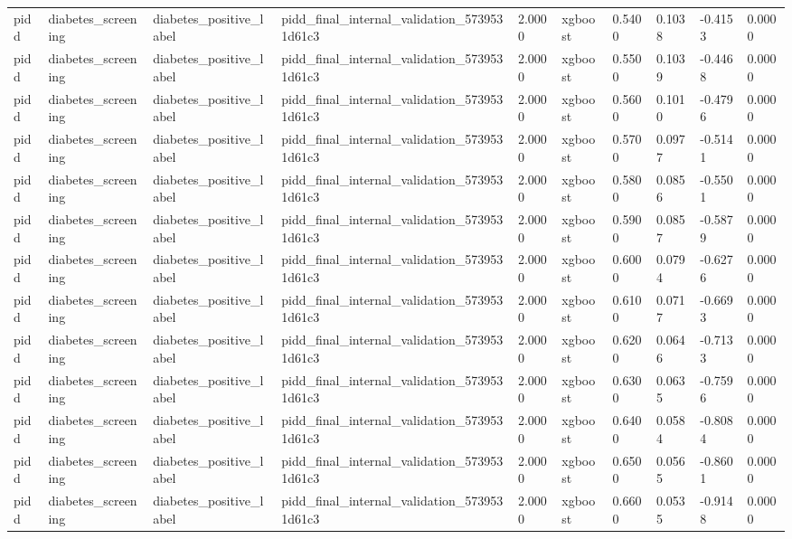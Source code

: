 \begin{tabular}{llllllllll}
pidd & diabetes\_screening & diabetes\_positive\_label & pidd\_final\_internal\_validation\_5739531d61c3 & 2.0000 & xgboost & 0.5400 & 0.1038 & -0.4153 & 0.0000 \\
pidd & diabetes\_screening & diabetes\_positive\_label & pidd\_final\_internal\_validation\_5739531d61c3 & 2.0000 & xgboost & 0.5500 & 0.1039 & -0.4468 & 0.0000 \\
pidd & diabetes\_screening & diabetes\_positive\_label & pidd\_final\_internal\_validation\_5739531d61c3 & 2.0000 & xgboost & 0.5600 & 0.1010 & -0.4796 & 0.0000 \\
pidd & diabetes\_screening & diabetes\_positive\_label & pidd\_final\_internal\_validation\_5739531d61c3 & 2.0000 & xgboost & 0.5700 & 0.0977 & -0.5141 & 0.0000 \\
pidd & diabetes\_screening & diabetes\_positive\_label & pidd\_final\_internal\_validation\_5739531d61c3 & 2.0000 & xgboost & 0.5800 & 0.0856 & -0.5501 & 0.0000 \\
pidd & diabetes\_screening & diabetes\_positive\_label & pidd\_final\_internal\_validation\_5739531d61c3 & 2.0000 & xgboost & 0.5900 & 0.0857 & -0.5879 & 0.0000 \\
pidd & diabetes\_screening & diabetes\_positive\_label & pidd\_final\_internal\_validation\_5739531d61c3 & 2.0000 & xgboost & 0.6000 & 0.0794 & -0.6276 & 0.0000 \\
pidd & diabetes\_screening & diabetes\_positive\_label & pidd\_final\_internal\_validation\_5739531d61c3 & 2.0000 & xgboost & 0.6100 & 0.0717 & -0.6693 & 0.0000 \\
pidd & diabetes\_screening & diabetes\_positive\_label & pidd\_final\_internal\_validation\_5739531d61c3 & 2.0000 & xgboost & 0.6200 & 0.0646 & -0.7133 & 0.0000 \\
pidd & diabetes\_screening & diabetes\_positive\_label & pidd\_final\_internal\_validation\_5739531d61c3 & 2.0000 & xgboost & 0.6300 & 0.0635 & -0.7596 & 0.0000 \\
pidd & diabetes\_screening & diabetes\_positive\_label & pidd\_final\_internal\_validation\_5739531d61c3 & 2.0000 & xgboost & 0.6400 & 0.0584 & -0.8084 & 0.0000 \\
pidd & diabetes\_screening & diabetes\_positive\_label & pidd\_final\_internal\_validation\_5739531d61c3 & 2.0000 & xgboost & 0.6500 & 0.0565 & -0.8601 & 0.0000 \\
pidd & diabetes\_screening & diabetes\_positive\_label & pidd\_final\_internal\_validation\_5739531d61c3 & 2.0000 & xgboost & 0.6600 & 0.0535 & -0.9148 & 0.0000 \\

\end{tabular}
